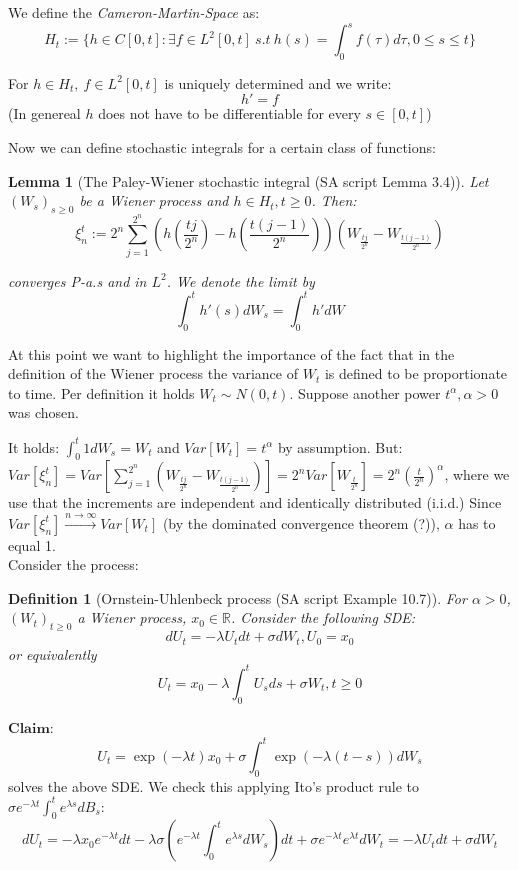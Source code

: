 \documentclass[%
thesis=student,%
coverpage=false,%
titlepage=false,%
headmarks=true, %
english,%
font=libertine, %
math=newpxtx, %
BCOR=5mm,%
coverBCOR=11mm%
]{tumbook}
\newtheorem{definition}{Definition}[section]
\newtheorem{lemma}{Lemma}
\begin{document}
We define the \textit{Cameron-Martin-Space} as:
\[
H_{t} := \{ h \in C[0,t]: \exists f \in L^{2}[0,t] \ s.t \  h(s) = \int_{0}^{s} f(\tau) d\tau, 0 \leq s \leq t \}
\]

For $h \in H_{t},\ f \in L^{2}[0,t]$ is uniquely determined and we write: 
\[
h' = f
\]
(In genereal $h$ does not have to be differentiable for every $s \in [0,t]$)

Now we can define stochastic integrals for a certain class of functions:

\begin{lemma}[The Paley-Wiener stochastic integral (SA script Lemma 3.4)] 
Let $(W_{s})_{s\geq 0}$ be a Wiener process and $h \in H_{t}, t \geq 0$. Then:
\[
\xi_{n}^{t} := 2^{n}\sum_{j=1}^{2^{n}}(h(\frac{tj}{2^{n}})-h(\frac{t(j-1)}{2^{n}}))(W_{\frac{tj}{2^{n}}}-W_{\frac{t(j-1)}{2^{n}}}) 
\]

converges P-a.s and in $L^{2}$. We denote the limit by
\[
\int_{0}^{t}h'(s)dW_{s} = \int_{0}^{t}h'dW
\]
\end{lemma}

At this point we want to highlight the importance of the fact that in the definition of the Wiener process the variance of $W_{t}$ is defined to be proportionate to time. Per definition it holds $W_{t} \sim N(0,t)$. Suppose another power $t^{\alpha}, \alpha > 0$ was chosen. 

It holds: $\int_{0}^{t} 1 dW_{s} = W_{t}$ and $Var[W_{t}] = t^{\alpha}$ by assumption. But: 
$Var[\xi_{n}^{t}] = Var\left[\sum_{j=1}^{2^{n}}\left(W_{\frac{tj}{2^{n}}} - W_{\frac{t(j-1)}{2^{n}}}\right)\right] = 2^{n}Var\left[W_{\frac{t}{2^n}}\right] = 2^{n}\left(\frac{t}{2^{n}}\right)^{\alpha}$, where we use that the increments are independent and identically distributed (i.i.d.) Since  $Var[\xi_{n}^{t}] \xrightarrow{n \rightarrow \infty} Var[W_{t}]$ (by the dominated convergence theorem (?)), $\alpha$ has to equal 1. \\

Consider the process:

\begin{definition}[Ornstein-Uhlenbeck process (SA script Example 10.7)] 
For $\alpha > 0$, $(W_{t})_{t\geq 0}$ a Wiener process, $x_{0} \in \mathbb{R}$. Consider the following SDE:
\[
dU_{t} = -\lambda U_{t} dt + \sigma dW_{t}, U_{0} = x_{0}
\]
\label{def:OU process}
or equivalently
\[
U_{t} = x_{0} - \lambda\int_{0}^{t}U_{s}ds + \sigma W_{t}, t \geq 0
\]  
\end{definition}

$\textbf{Claim}$: 
\[
U_{t} = \exp(-\lambda t)x_{0} + \sigma\int_{0}^{t}\exp(-\lambda (t-s))dW_{s}
\]
solves the above SDE. We check this applying Ito's product rule to $\sigma e^{-\lambda t}\int_{0}^{t}e^{\lambda s}dB_{s}$:
\[
dU_{t} = -\lambda x_{0}e^{-\lambda t}dt - \lambda\sigma(e^{-\lambda t}\int_{0}^{t}e^{\lambda s}dW_{s})dt + \sigma e^{-\lambda t}e^{\lambda t}dW_{t} = -\lambda U_{t} dt + \sigma dW_{t}
\]
\end{document}
